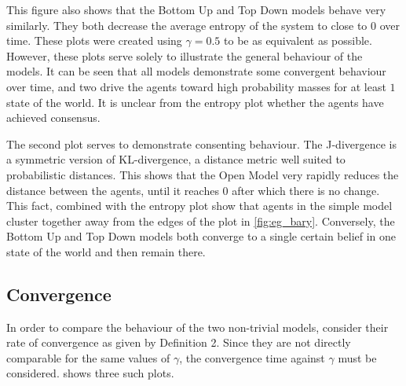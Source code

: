 This figure also shows that the Bottom Up and Top Down models behave very similarly. They both decrease the average entropy of the system to close to $0$ over time. These plots were created using $\gamma = 0.5$ to be as equivalent as possible. However, these plots serve solely to illustrate the general behaviour of the models. It can be seen that all models demonstrate some convergent behaviour over time, and two drive the agents toward high probability masses for at least $1$ state of the world. It is unclear from the entropy plot whether the agents have achieved consensus. 

The second plot serves to demonstrate consenting behaviour. The J-divergence is a symmetric version of KL-divergence, a distance metric well suited to probabilistic distances. This shows that the Open Model very rapidly reduces the distance between the agents, until it reaches $0$ after which there is no change. This fact, combined with the entropy plot show that agents in the simple model cluster together away from the edges of the plot in \cref{fig:eg_bary}. Conversely, the Bottom Up and Top Down models both converge to a single certain belief in one state of the world and then remain there. 



\subsection{Convergence}

In order to compare the behaviour of the two non-trivial models, consider their rate of convergence as given by Definition 2. Since they are not directly comparable for the same values of $\gamma$, the convergence time against $\gamma$ must be considered.  shows three such plots. 

